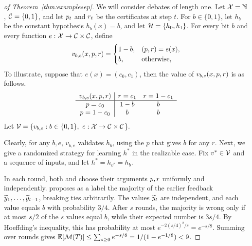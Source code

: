 \documentclass[anon]{alt2027} %
\begin{document}
\begin{proof}[of Theorem~\ref{thm:examplesep}]
We will consider debates of length one. Let ${\mathcal X}=\mathbb{N}$, ${{\mathcal C}}=\{0,1\}$, and let ${p}_t$ and ${r}_t$ be the certificates at step $t$. For $b\in\{0,1\}$, let $h_b$ be the constant hypothesis $h_b(x)=b$, and let ${{\mathcal H}}=\{h_0,h_1\}$. For every bit $b$ and every function $e:{\mathcal X}\to {{\mathcal C}}\times{{\mathcal C}}$, define
\[
v_{b,e}(x,{p},{r})=
\begin{cases}
1-b, & ({p},{r})=e(x),\\
b, & \text{otherwise},
\end{cases}
\]
To illustrate, suppose that $e(x) = (c_0,c_1)$, then the value of $v_{b,e}(x,{p},{r})$ is as follows.
\[
\begin{array}{c|cc}
v_{b,e}(x,{p},{r}) & {r}=c_1 & {r}=1-c_1\\
\hline
{p}=c_0 & 1-b & b\\
{p}=1-c_0 & b & b
\end{array}
\]
Let ${\mathcal V}=\{v_{b,e}:b\in\{0,1\},\ e:{\mathcal X}\to {{\mathcal C}}\times{{\mathcal C}}$\}. 

Clearly, for any $b,e$, $v_{b,e}$ validates $h_b$, using the $p$ that gives $b$ for any $r$. %
Next, we give a randomized strategy for learning $h^*$ in the realizable case. Fix $v^*\in{\mathcal V}$ and a sequence of inputs, and let $h^*=h_{v^*}=h_b$. 


In each round, both \dt and \df choose their arguments ${p},{r}$ uniformly and independently. \dt proposes as a label the majority of the earlier feedback ${\widetilde{y}}_1,\ldots,{\widetilde{y}}_{t-1}$, breaking ties arbitrarily. 
The values ${\widetilde{y}}_t$ are independent, and each value equals $b$ with probability $3/4$. After $s$ rounds, the majority is wrong only if at most $s/2$ of the $s$ values equal $b$, while their expected number is $3s/4$. By Hoeffding's inequality, this has probability at most $e^{-2(s/4)^2/s}=e^{-s/8}$. Summing over rounds gives $\mathbb{E}[{\mathcal M}(T)]\le\sum_{s\ge0}e^{-s/8}=1/(1-e^{-1/8})<9$. 


\end{proof}
\end{document}
